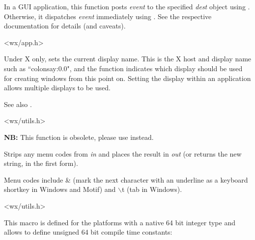 \label{wxpostevent}


In a GUI application, this function posts {\it event} to the specified {\it dest}
object using .
Otherwise, it dispatches {\it event} immediately using
.
See the respective documentation for details (and caveats).


<wx/app.h>


\label{wxsetdisplayname}


Under X only, sets the current display name. This is the X host and display name such
as ``colonsay:0.0", and the function indicates which display should be used for creating
windows from this point on. Setting the display within an application allows multiple
displays to be used.

See also .


<wx/utils.h>


\label{wxstripmenucodes}



{\bf NB:} This function is obsolete, please use
 instead.

Strips any menu codes from {\it in} and places the result
in {\it out} (or returns the new string, in the first form).

Menu codes include \& (mark the next character with an underline
as a keyboard shortkey in Windows and Motif) and $\backslash$t (tab in Windows).


<wx/utils.h>


\label{wxull}


This macro is defined for the platforms with a native 64 bit integer type and
allows to define unsigned 64 bit compile time constants:

